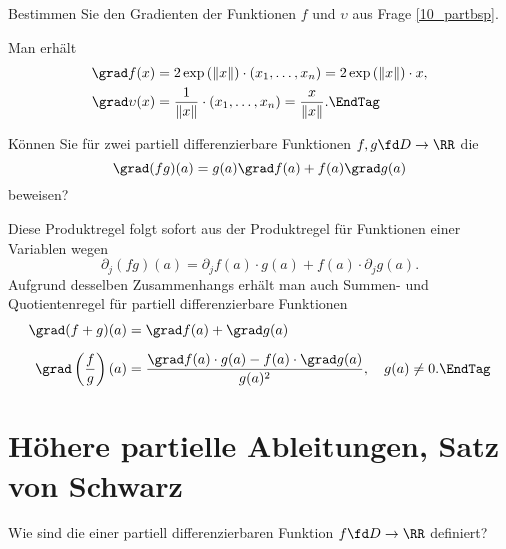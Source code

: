\begin{frage}
  Bestimmen Sie den Gradienten der Funktionen $f$ und 
  $\upsilon$ aus Frage \ref{10_partbsp}.
\end{frage}

\begin{antwort}
  Man erhält 
  \begin{align*}
    \grad f(x) 
    &= 2\exp\left(\|x\|\right) \cdot (x_1,\ldots,x_n) = 
    2\exp\left(\|x\|\right)\cdot x,  \\
    \grad \upsilon(x) 
    &= \frac{1}{\|x\|} \cdot (x_1,\ldots,x_n) = \frac{x}{\|x\|}.
    \EndTag
  \end{align*}
\end{antwort}

\begin{frage}
  Können Sie für zwei partiell differenzierbare Funktionen 
  $f, g \fd D\to \RR$ die 
  \[
  \grad (fg)(a) = g(a) \grad f(a) + f(a) \grad g(a)
  \]
  beweisen?
\end{frage}

\begin{antwort}
  Diese Produktregel folgt sofort aus der Produktregel für Funktionen 
  einer Variablen wegen
  \[
  \partial_j (fg)(a)=\partial_j f(a)\cdot g(a) + f(a) \cdot \partial_j g(a). 
  \]
  Aufgrund desselben Zusammenhangs erhält man auch Summen- und 
  Quotientenregel für partiell differenzierbare Funktionen
  \begin{align}
    \grad(f+g)(a) &= \grad f(a) + \grad g(a) \notag \\[2mm]
    \grad \left(\frac{f}{g} \right)(a) &=  
    \frac{\grad f(a) \cdot g(a) - f(a) \cdot \grad g(a) }{ g(a)^2 }, 
    \quad g(a)\not=0. \EndTag
  \end{align}  
\end{antwort}


\section{Höhere partielle Ableitungen, Satz von Schwarz}


\begin{frage}
  Wie sind die  einer partiell differenzierbaren 
  Funktion $f\fd D\to \RR$ definiert?
\end{frage}

